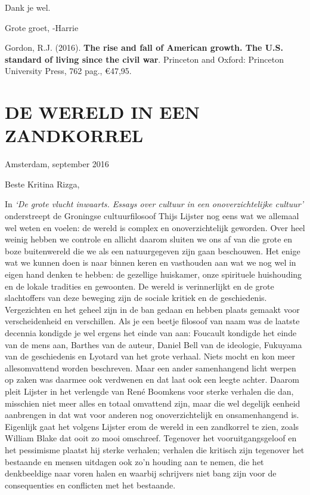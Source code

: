 \documentclass[]{book}
\begin{document}
Dank je wel.

Grote groet, -Harrie

Gordon, R.J. (2016). \textbf{The rise and fall of American growth. The
U.S. standard of living since the civil war}. Princeton and Oxford:
Princeton University Press, 762 pag., €47,95.

\hypertarget{de-wereld-in-een-zandkorrel}{%
\chapter*{DE WERELD IN EEN
ZANDKORREL}\label{de-wereld-in-een-zandkorrel}}

Amsterdam, september 2016

Beste Kritina Rizga,

In \emph{`De grote vlucht inwaarts. Essays over cultuur in een
onoverzichtelijke cultuur'} onderstreept de Groningse cultuurfilosoof
Thijs Lijster nog eens wat we allemaal wel weten en voelen: de wereld is
complex en onoverzichtelijk geworden. Over heel weinig hebben we
controle en allicht daarom sluiten we ons af van die grote en boze
buitenwereld die we als een natuurgegeven zijn gaan beschouwen. Het
enige wat we kunnen doen is naar binnen keren en vasthouden aan wat we
nog wel in eigen hand denken te hebben: de gezellige huiskamer, onze
spirituele huishouding en de lokale tradities en gewoonten. De wereld is
verinnerlijkt en de grote slachtoffers van deze beweging zijn de sociale
kritiek en de geschiedenis. Vergezichten en het geheel zijn in de ban
gedaan en hebben plaats gemaakt voor verscheidenheid en verschillen. Als
je een beetje filosoof van naam was de laatste decennia kondigde je wel
ergens het einde van aan: Foucault kondigde het einde van de mens aan,
Barthes van de auteur, Daniel Bell van de ideologie, Fukuyama van de
geschiedenis en Lyotard van het grote verhaal. Niets mocht en kon meer
allesomvattend worden beschreven. Maar een ander samenhangend licht
werpen op zaken was daarmee ook verdwenen en dat laat ook een leegte
achter. Daarom pleit Lijster in het verlengde van René Boomkens voor
sterke verhalen die dan, misschien niet meer alles en totaal omvattend
zijn, maar die wel degelijk eenheid aanbrengen in dat wat voor anderen
nog onoverzichtelijk en onsamenhangend is. Eigenlijk gaat het volgens
Lijster erom de wereld in een zandkorrel te zien, zoals William Blake
dat ooit zo mooi omschreef. Tegenover het vooruitgangsgeloof en het
pessimisme plaatst hij sterke verhalen; verhalen die kritisch zijn
tegenover het bestaande en mensen uitdagen ook zo'n houding aan te
nemen, die het denkbeeldige naar voren halen en waarbij schrijvers niet
bang zijn voor de consequenties en conflicten met het bestaande.
\end{document}
